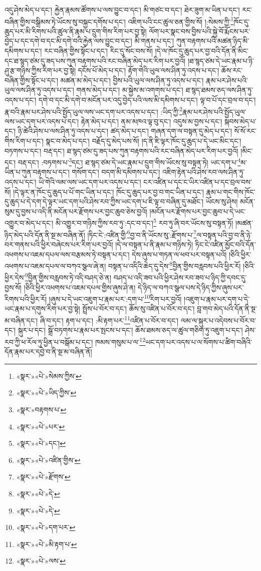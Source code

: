 འདུ་ཤེས་མེད་པ་དང་། རྐྱེན་རྣམས་ཚོགས་པ་ལས་བྱུང་བ་དང་། མི་གཙང་བ་དང་། ཐེར་ཟུག་མ་ཡིན་པ་དང་། རང་བཞིན་གྱིས་བསྒྲིམས་ཏེ་ཡོངས་སུ་བསྐྱང་དགོས་པ་དང་། འཇིག་པའི་ངང་ཚུལ་ཅན་གྱིས་སོ། །:སེམས་ཀྱི་\footnote{«སྣར་»«པེ་»སེམས་ཀྱིས་}ཁོང་དུ་ཆུད་པར་མི་རིགས་པའི་ཚུལ་ནི་རྣམ་པ་དྲུག་གིས་རིག་པར་བྱ་སྟེ། ལོག་པར་སྣང་བས་བྱིས་པའི་སྐྱེ་བོ་རྨོངས་པར་བྱེད་པ་དང་དགེ་བ་དང་མི་དགེ་བའི་རྐྱེན་ལས་བྱུང་བ་དང་། མི་གནས་པ་དང་། ཀུན་བརྟགས་པའི་མཚན་ཉིད་མི་དམིགས་པ་དང་། རང་བཞིན་གྱིས་སྟོང་པ་དང་། རིང་དུ་སོང་བས་སོ། །དེ་ལ་ཁོང་དུ་ཆུད་པར་བྱ་བའི་དོན་ནི་མིང་དང་ཐ་སྙད་ཙམ་དུ་ཟད་པས་ཀུན་བརྟགས་པའི་རང་བཞིན་མེད་པར་རིག་པར་བྱའོ། །ཐ་སྙད་ཙམ་དེ་ཡང་རྣམ་པ་ཉི་ཤུ་རྩ་གཉིས་ཀྱིས་རིག་པར་བྱ་སྟེ། དངོས་པོ་མེད་པ་དང་། རྟོག་གེའི་ཡུལ་ལས་ཤིན་ཏུ་འདས་པ་དང་། ཆོས་རང་བཞིན་གྱིས་སྟོང་པ་དང་། མཚན་མ་མེད་པ་དང་། བྱིས་པའི་ཡུལ་ལས་ཤིན་ཏུ་འདས་པ་དང་། རྣམ་པར་ཤེས་པའི་ཡུལ་ལས་ཤིན་ཏུ་འདས་པ་དང་། གནས་མེད་པ་དང་། མ་སྐྱེས་མ་འགགས་པ་དང་། ཐ་སྙད་ཐམས་ཅད་ལས་ཤིན་ཏུ་འདས་པ་དང་། དགེ་བ་དང་མི་དགེ་བ་མངོན་པར་འདུ་བྱེད་པའི་ལས་མི་དམིགས་པ་དང་། ལྟ་བ་པོ་དང་བྲལ་བ་དང་། རྣ་བའི་རྣམ་པར་ཤེས་པའི་སྤྱོད་ཡུལ་ལས་ཡང་དག་པར་འདས་པ་དང་། :ཡིད་ཀྱི་\footnote{«སྣར་»«པེ་»ཡིད་ཀྱིས་}རྣམ་པར་ཤེས་པའི་སྤྱོད་ཡུལ་ལས་ཡང་དག་པར་འདས་པ་དང་། རྟེན་མེད་པ་དང་། ནམ་མཁའ་ལྟ་བུ་དང་། འདུས་མ་བྱས་པ་དང་། སྐབས་མེད་པ་དང་། ཉི་ཚེའི་ཤེས་པ་ལས་ཤིན་ཏུ་འདས་པ་དང་། ཚད་མེད་པ་དང་། གཞན་དག་ལ་བསྟན་དུ་མེད་པ་དང་། སོ་སོ་རང་གིས་རིག་པ་དང་། སྣང་བ་མེད་པ་དང་། བརྗོད་དུ་མེད་པས་སོ། །ད་ནི་ཇི་ལྟར་ཁོང་དུ་ཆུད་པ་དེ་ཡང་མིང་དང་། བཏགས་པ་དང་། བརྡ་དང་། ཐ་སྙད་ཙམ་དུ་ཟད་པས་ཀུན་བརྟགས་པའི་རང་བཞིན་མེད་པར་རིག་པར་བྱའོ། །མིང་དང་། བརྡ་དང་། :བཏགས་པ་\footnote{«སྣར་»བརྟགས་པ་}དང་། ཐ་སྙད་ཙམ་དེ་ཡང་རྣམ་པ་དྲུག་གིས་ཡོངས་སུ་བསྟན་ཏེ། ཡང་དག་པ་\footnote{«སྣར་»«པེ་»པར་}མ་ཡིན་པ་ཀུན་བརྟགས་པ་དང་། གསོག་དང་། བདག་མི་དམིགས་པ་དང་། འཇིག་རྟེན་པའི་ཤེས་རབ་ལས་ཤིན་ཏུ་འདས་པ་དང་། ཡི་གེའི་ལམ་ལས་ཡང་དག་པར་འདས་པ་དང་། ངར་འཛིན་པ་དང་ང་ཡིར་འཛིན་པ་དང་བྲལ་བས་སོ། །དེ་ལྟར་ན་ཁོང་དུ་ཆུད་པ་པོ་གང་ཡིན་པ་དང་། ཁོང་དུ་ཆུད་པར་བྱ་བ་གང་ཡིན་པ་དང་། རྣམ་པ་གང་གིས་ཁོང་དུ་ཆུད་པ་དེ་དག་དེ་ལྟར་ཡང་དག་པའི་ཤེས་རབ་ཀྱིས་ཡང་དག་པ་ཇི་ལྟ་བ་བཞིན་དུ་མཐོང་། ཡོངས་སུ་ཤེས། མངོན་སུམ་དུ་བྱས་པ་འདི་ནི་མངོན་པར་རྫོགས་པར་བྱང་ཆུབ་ཅེས་བྱའོ། །མངོན་པར་རྫོགས་པར་བྱང་ཆུབ་པ་དེ་ཡང་འགྱུར་བ་མེད་པ་དང་། མི་འགྱུར་བ་གཉིས་ཀྱིས་རབ་ཏུ་:དང་བ་དང་།\footnote{«སྣར་»«པེ་»དང་།} རབ་ཏུ་ཞི་བར་ཡོངས་སུ་བསྟན་ཏོ། །མཚན་ཉིད་མེད་པའི་དོན་ནི་སྔ་མ་བཞིན་ནོ། །ཏིང་ངེ་:འཛིན་གྱི་\footnote{«སྣར་»«པེ་»འཛིན་གྱིས་}བྱ་བ་ནི་ཡོངས་སུ་:རྫོགས་པ་\footnote{«སྣར་»«པེ་»རྫོགས་}ལ་བསྟན་པའི་བྱ་བ་ནི་ཉེ་བར་གནས་པའི་ཕྱིར་བཞེངས་པར་རིག་པར་བྱའོ། །དེ་ལ་བསྟན་པ་ནི་རྣམ་པ་གཉིས་ཏེ། ཏིང་ངེ་འཛིན་མྱོང་བའི་དོན་འཕགས་པ་འཇམ་དཔལ་ལས་བརྩམས་ཏེ་བསྟན་པ་དང་། དེས་ཞུས་པ་གཏན་ལ་ཕབ་པར་བསྟན་པའོ། །ཅིའི་ཕྱིར་འཕགས་པ་འཇམ་དཔལ་ལ་བཀའ་སྩལ་ཞེ་ན། བསྟན་པ་འདིའི་ཆེད་དུ་དེས་\footnote{«སྣར་»«པེ་»དེ་}བྱིན་གྱིས་བརླབས་པའི་ཕྱིར་རོ། །ཅིའི་ཕྱིར་དེས་\footnote{«སྣར་»«པེ་»དེ་}བྱིན་གྱིས་བརླབས་ཏེ་འདི་བཤད་ཅེ་ན། བཤད་པ་འདི་ཟབ་པའི་ཕྱིར་ཤེས་རབ་ཟབ་པ་ཉིད་ཀྱི་དབང་དུ་བྱས་སོ། །ཅིའི་ཕྱིར་འཕགས་པ་འཇམ་དཔལ་གྱིས་ཞུས་ཤེ་ན། དེ་ཉིད་ལ་བཀའ་སྩལ་པས་དེ་ཉིད་ཀྱིས་ཞུས་པར་རིགས་པའི་ཕྱིར་རོ། །ཞུས་པ་དེ་ཡང་འཇུག་པ་རྣམ་པར་:དག་པ་\footnote{«སྣར་»«པེ་»དག་པར་}རིག་པར་བྱའོ། །འཇུག་པ་རྣམ་པར་དག་པ་དེ་ཡང་རྣམ་པ་དགུས་རིག་པར་བྱ་སྟེ། སྤྲོས་པ་བོར་བ་དང་། ཆོས་སུ་འཛིན་པ་བོར་བ་དང་། བླ་གབ་མེད་པའི་དོན་ནི་སྔ་མ་བཞིན་དང་། ཞི་བ་དང་། རྟག་པ་དང་། :མི་རྟག་པར་\footnote{«སྣར་»«པེ་»མི་རྟག་པ་}འཛིན་པ་བོར་བ་དང་། ལམ་ལ་སྐུར་པ་འདེབས་པ་བོར་བ་དང་། སྐུར་པ་དང་། སྒྲོ་བཏགས་པ་རྣམ་པར་སྤངས་པ་དང་། ཆོས་ཐམས་ཅད་ལ་ཚུལ་གཅིག་ཏུ་འཇུག་པ་དང་། ཤེས་རབ་ཀྱི་ཕ་རོལ་ཏུ་ཕྱིན་པ་བསྒོམ་པ་དང་། ཁམས་གསུམ་པ་ལ་\footnote{«སྣར་»«པེ་»ལས་}ཡང་དག་པར་འདས་པ་ལ་སོགས་པ་ཚིག་བཞིའི་དོན་རྣམ་པར་དབྱེ་བ་ནི་སྔ་མ་བཞིན་ནོ། 